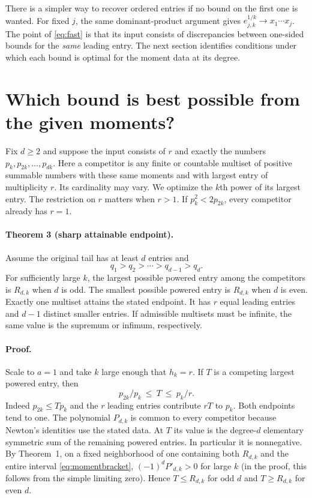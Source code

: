 \documentclass[11pt]{article}
\begin{document}
There is a simpler way to recover ordered entries if no bound on the first
one is wanted. For fixed $j$, the same dominant-product argument gives
$e_{j,k}^{1/k}\to x_1\cdots x_j$. The point of \eqref{eq:fast} is that
its input consists of discrepancies between one-sided bounds for the
\emph{same} leading entry. The next section identifies conditions under which
each bound is optimal for the moment data at its degree.

\section{Which bound is best possible from the given moments?}

Fix $d\ge2$ and suppose the input consists of $r$ and exactly the numbers
$p_k,p_{2k},\ldots,p_{dk}$. Here a competitor is any finite or countable multiset
of positive summable numbers with these same moments and with largest entry of
multiplicity $r$. Its cardinality may vary. We optimize the $k$th power of its
largest entry. The restriction on $r$ matters when $r>1$. If
$p_k^2<2p_{2k}$, every competitor already has $r=1$.

\paragraph{Theorem 3 (sharp attainable endpoint).}
Assume the original tail has at least $d$ entries and
\[
     q_1>q_2>\cdots>q_{d-1}>q_d .
\]
For sufficiently large $k$, the largest possible powered entry among the
competitors is $R_{d,k}$ when $d$ is odd. The smallest possible powered entry
is $R_{d,k}$ when $d$ is even. Exactly one multiset attains the stated
endpoint. It has $r$ equal leading entries and $d-1$ distinct smaller entries.
If admissible multisets must be infinite, the same value is the supremum or
infimum, respectively.

\paragraph{Proof.}
Scale to $a=1$ and take $k$ large enough that $h_k=r$. If $T$ is a competing
largest powered entry, then
\begin{equation}\label{eq:momentbracket}
             p_{2k}/p_k\ \le\ T\ \le\ p_k/r .
\end{equation}
Indeed $p_{2k}\le T p_k$ and the $r$ leading entries contribute $rT$ to $p_k$.
Both endpoints tend to one. The polynomial $P_{d,k}$ is common to every
competitor because Newton's identities use the stated data. At $T$ its value
is the degree-$d$ elementary symmetric sum of the remaining powered entries.
In particular it is nonnegative. By Theorem~1, on a fixed neighborhood of one
containing both $R_{d,k}$ and the entire interval \eqref{eq:momentbracket},
$(-1)^dP'_{d,k}>0$ for large $k$ (in the proof, this follows from the simple
limiting zero). Hence $T\le R_{d,k}$ for odd $d$ and $T\ge R_{d,k}$ for even $d$.
\end{document}
